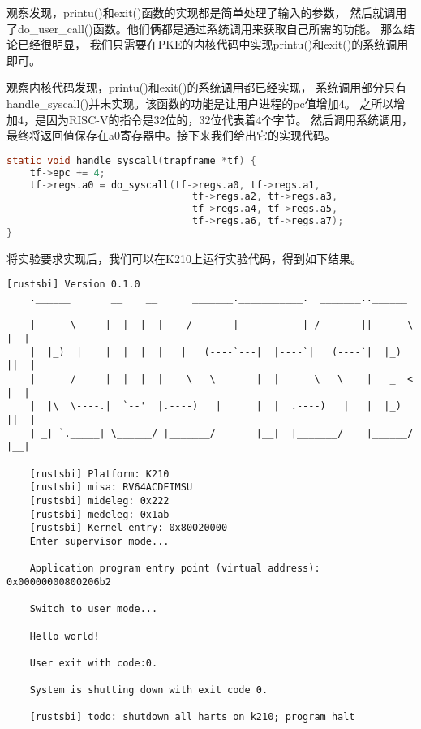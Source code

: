 观察发现，printu()和exit()函数的实现都是简单处理了输入的参数，
然后就调用了do\_user\_call()函数。他们俩都是通过系统调用来获取自己所需的功能。
那么结论已经很明显，
我们只需要在PKE的内核代码中实现printu()和exit()的系统调用即可。

观察内核代码发现，printu()和exit()的系统调用都已经实现，
系统调用部分只有handle\_syscall()并未实现。该函数的功能是让用户进程的pc值增加4。
之所以增加4，是因为RISC-V的指令是32位的，32位代表着4个字节。
然后调用系统调用，最终将返回值保存在a0寄存器中。接下来我们给出它的实现代码。

\begin{lstlisting}[caption={handle\_syscall的实现}, label={lst:handle_syscall}, language=C]
static void handle_syscall(trapframe *tf) {
    tf->epc += 4;
    tf->regs.a0 = do_syscall(tf->regs.a0, tf->regs.a1,
                                tf->regs.a2, tf->regs.a3, 
                                tf->regs.a4, tf->regs.a5, 
                                tf->regs.a6, tf->regs.a7);
}
\end{lstlisting}

将实验要求实现后，我们可以在K210上运行实验代码，得到如下结果。

\begin{lstlisting}[caption={lab1实验结果}, label={lst:lab1_result}]
    [rustsbi] Version 0.1.0
    .______       __    __      _______.___________.  _______..______   __
    |   _  \     |  |  |  |    /       |           | /       ||   _  \ |  |
    |  |_)  |    |  |  |  |   |   (----`---|  |----`|   (----`|  |_)  ||  |
    |      /     |  |  |  |    \   \       |  |      \   \    |   _  < |  |
    |  |\  \----.|  `--'  |.----)   |      |  |  .----)   |   |  |_)  ||  |
    | _| `._____| \______/ |_______/       |__|  |_______/    |______/ |__|
    
    [rustsbi] Platform: K210
    [rustsbi] misa: RV64ACDFIMSU
    [rustsbi] mideleg: 0x222
    [rustsbi] medeleg: 0x1ab
    [rustsbi] Kernel entry: 0x80020000
    Enter supervisor mode...
    
    Application program entry point (virtual address): 0x00000000800206b2
    
    Switch to user mode...
    
    Hello world!
    
    User exit with code:0.
    
    System is shutting down with exit code 0.
    
    [rustsbi] todo: shutdown all harts on k210; program halt
        
\end{lstlisting}


